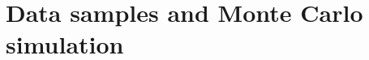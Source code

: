 \section{Data samples and Monte Carlo simulation}
\label{sec:datasamples_and_MonteCarloSimulation}


